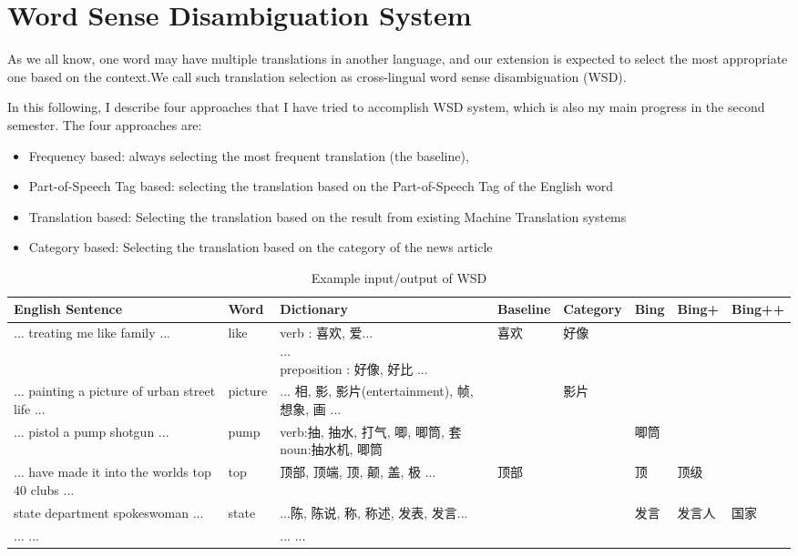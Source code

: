 \section{Word Sense Disambiguation System}
\begin{CJK}{UTF8}{gbsn}
As we all know, one word may have multiple translations in another language, and our extension is expected to select the most appropriate one based on the context.We call such translation selection as cross-lingual word sense disambiguation (WSD).

In this following, I describe four approaches that I have tried to accomplish WSD system, which is also my main progress in the second semester. The four approaches are: 

\begin{itemize}
\item Frequency based: always selecting the most frequent translation (the baseline),
\item Part-of-Speech Tag based: selecting the translation based on the Part-of-Speech Tag of the English word
\item Translation based: Selecting the translation based on the result from existing Machine Translation systems
\item Category based: Selecting the translation based on the category of the news article
\end{itemize}

\begin{table*}[t]
	\caption{Example input/output of WSD}
	\label{table:wsd_1}
	\begin{center}
	\begin{tabular}{| p{3cm} | p{1cm} | p{3.5cm} | p{1.2cm} | p{1.3cm}| p{0.8cm} | p{0.9cm} | p{1cm} |}
		\hline
		English Sentence & Word & Dictionary & Baseline & Category & Bing & Bing+ & Bing++ \\
		\hline
		... treating me like family ... & like & \parbox[t]{3cm}{verb : 喜欢, 爱...\\ ... \\preposition : 好像, 好比 ...} & 喜欢 & 好像 & & & \\
		\hline
		... painting a picture of urban street life ... & picture & \parbox[t]{3cm}{... 相, 影, 影片(entertainment), 帧, 想象, 画 ...} & & 影片 & & & \\
		\hline
		... pistol a pump shotgun ... & pump & \parbox[t]{3cm}{verb:抽, 抽水, 打气, 唧, 唧筒, 套\\ noun:抽水机, 唧筒} & & & 唧筒 & & \\
		\hline
		... have made it into the worlds top 40 clubs ... & top & \parbox[t]{3cm}{顶部, 顶端, 顶, 颠, 盖, 极 ...} & 顶部 &  & 顶 & 顶级 & \\
		\hline
		state department spokeswoman ... & state & \parbox[t]{3cm}{...陈, 陈说, 称, 称述, 发表, 发言...} & & & 发言 & 发言人 & 国家 \\
		\hline
		...  ... &  & \parbox[t]{3cm}{...  ...} & & & & & \\
		\hline
	\end{tabular}
	\end{center}
\end{table*}


\end{CJK}
